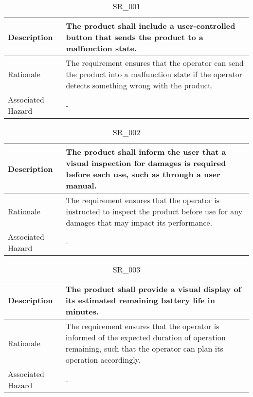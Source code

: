 \documentclass{article}
\begin{document}
\begin{table}[!h]
\begin{center}
\caption {SR\_001} 
\label{SR_001}
\begin{tabular}{ | m{3cm} | m{11cm} | }
\hline
Description & The product shall include a user-controlled button that sends the product to a malfunction state.
 \\
\hline
Rationale & The requirement ensures that the operator can send the product into a malfunction state if the operator detects something wrong with the product. \\
\hline
Associated Hazard & - \\
\hline
\end{tabular}
\end{center}
\end{table}

\begin{table}[!h]
\begin{center}
\caption {SR\_002} 
\label{SR_002}
\begin{tabular}{ | m{3cm} | m{11cm} | }
\hline
Description & The product shall inform the user that a visual inspection for damages is required before each use, such as through a user manual.
 \\
\hline
Rationale & The requirement ensures that the operator is instructed to inspect the product before use for any damages that may impact its performance. \\
\hline
Associated Hazard & - \\
\hline
\end{tabular}
\end{center}
\end{table}

\begin{table}[!h]
\begin{center}
\caption {SR\_003} 
\label{SR_003}
\begin{tabular}{ | m{3cm} | m{11cm} | }
\hline
Description & The product shall provide a visual display of its estimated remaining battery life in minutes.
 \\
\hline
Rationale & The requirement ensures that the operator is informed of the expected duration of operation remaining, such that the operator can plan its operation accordingly. \\
\hline
Associated Hazard & - \\
\hline
\end{tabular}
\end{center}
\end{table}
\end{document}
